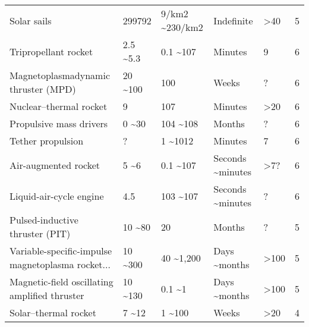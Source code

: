 \begin{landscape}
\begin{longtable}{lllllr}
                                       Solar sails &  299792 &  9/km2 \textasciitilde 230/km2 &              Indefinite &                    >40 &    5 \\
                              Tripropellant rocket &                            2.5 \textasciitilde 5.3 &        0.1 \textasciitilde 107 &                 Minutes &                      9 &    6 \\
               Magnetoplasmadynamic thruster (MPD) &                             20 \textasciitilde 100 &              100 &                   Weeks &                      ? &    6 \\
                            Nuclear–thermal rocket &                                    9 &              107 &                 Minutes &                    >20 &    6 \\
                           Propulsive mass drivers &                               0 \textasciitilde 30 &        104 \textasciitilde 108 &                  Months &                      ? &    6 \\
                                 Tether propulsion &                                    ? &         1 \textasciitilde 1012 &                 Minutes &                      7 &    6 \\
                              Air-augmented rocket &                                5 \textasciitilde 6 &        0.1 \textasciitilde 107 &       Seconds \textasciitilde minutes &                    >7? &    6 \\
                           Liquid-air-cycle engine &                                  4.5 &        103 \textasciitilde 107 &       Seconds \textasciitilde minutes &                      ? &    6 \\
                   Pulsed-inductive thruster (PIT) &                              10 \textasciitilde 80 &               20 &                  Months &                      ? &    5 \\
 Variable-specific-impulse magnetoplasma rocket... &                             10 \textasciitilde 300 &       40 \textasciitilde 1,200 &           Days \textasciitilde months &                   >100 &    5 \\
     Magnetic-field oscillating amplified thruster &                             10 \textasciitilde 130 &          0.1 \textasciitilde 1 &           Days \textasciitilde months &                   >100 &    5 \\
                              Solar–thermal rocket &                               7 \textasciitilde 12 &          1 \textasciitilde 100 &                   Weeks &                    >20 &    4 \\

\end{longtable}
\end{landscape}
